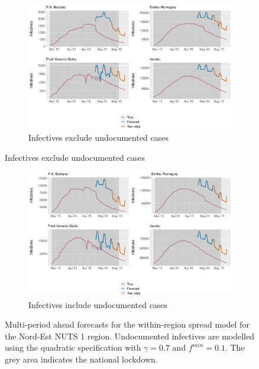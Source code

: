 \documentclass[12pt]{article}
\begin{document}
\begin{appendices}
		\begin{figure}[H]
    	    \centering
    	    \begin{subfigure}{\textwidth}
    	      \centering
    	      \includegraphics[width=0.91\linewidth]{output/model_within_lag14_forecast_full_Nord-Est.pdf}
    	      \caption{Infectives exclude undocumented cases}
    	      \label{fig:forecast_full_within_nordest_regular}
    	    \end{subfigure}
        \end{figure}
        \begin{figure}[H]\ContinuedFloat
    	    \begin{subfigure}{\textwidth}
    	      \centering
    	      \includegraphics[width=0.91\linewidth]{output/model_within_lag14_forecast_full_Nord-Est_UndocQuadratic.pdf}
    	      \caption{Infectives include undocumented cases}
    	      \label{fig:forecast_full_within_nordest_undoc}
    	    \end{subfigure}
    	    \caption{Multi-period ahead forecasts for the within-region spread model for the Nord-Est NUTS 1 region. Undocumented infectives are modelled using the quadratic specification with $\gamma = 0.7$ and $f^{min}=0.1$. The grey area indicates the national lockdown.}
    	    \label{fig:forecast_full_within_nordest}
        \end{figure}
        

\end{appendices}
\end{document}
